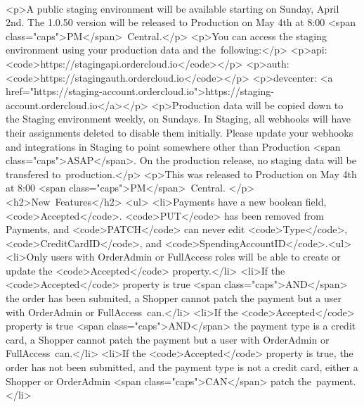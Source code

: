 \documentclass{memoir}%
\begin{document}
\paragraph*{}%
<p>A public staging environment will be available starting on Sunday, April 2nd. The 1.0.50 version will be released to Production on May 4th at 8:00 <span class="caps">PM</span>~Central.</p>\newline%
<p>You can access the staging environment using your production data and the~following:</p>\newline%
<p>api: <code>https://stagingapi.ordercloud.io</code></p>\newline%
<p>auth: <code>https://stagingauth.ordercloud.io</code></p>\newline%
<p>devcenter: <a href="https://staging{-}account.ordercloud.io">https://staging{-}account.ordercloud.io</a></p>\newline%
<p>Production data will be copied down to the Staging environment weekly, on Sundays. In Staging, all webhooks will have their assignments deleted to disable them initially. Please update your webhooks and integrations in Staging to point somewhere other than Production <span class="caps">ASAP</span>. On the production release, no staging data will be transfered to~production.</p>\newline%
<p>This was released to Production on May 4th at 8:00 <span class="caps">PM</span>~Central. </p>\newline%
<h2>New~Features</h2>\newline%
<ul>\newline%
<li>Payments have a new boolean field, <code>Accepted</code>. <code>PUT</code> has been removed from Payments, and <code>PATCH</code> can never edit <code>Type</code>, <code>CreditCardID</code>, and <code>SpendingAccountID</code>.<ul>\newline%
<li>Only users with OrderAdmin or FullAccess roles will be able to create or update the <code>Accepted</code> property.</li>\newline%
<li>If the <code>Accepted</code> property is true <span class="caps">AND</span> the order has been submited, a Shopper cannot patch the payment but a user with OrderAdmin or FullAccess~can.</li>\newline%
<li>If the <code>Accepted</code> property is true <span class="caps">AND</span> the payment type is a credit card, a Shopper cannot patch the payment but a user with OrderAdmin or FullAccess~can.</li>\newline%
<li>If the <code>Accepted</code> property is true, the order has not been submitted, and the payment type is not a credit card, either a Shopper or OrderAdmin <span class="caps">CAN</span> patch the~payment.</li>\newline%
\end{document}
